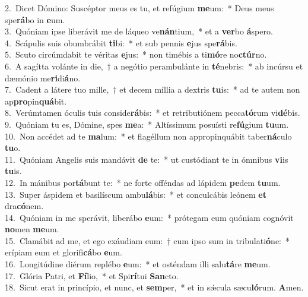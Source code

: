 {2.~}Dicet Dómino: Suscéptor meus es tu, et refúgium \textbf{me}um:~* Deus meus spe\textbf{rá}bo in \textbf{e}um.\\
{3.~}Quóniam ipse liberávit me de láqueo ve\textbf{nán}tium,~* et a \textbf{ver}bo \textbf{á}spero.\\
{4.~}Scápulis suis obumbrábit \textbf{ti}bi:~* et sub pennis \textbf{e}jus spe\textbf{rá}bis.\\
{5.~}Scuto circúmdabit te véritas \textbf{e}jus:~* non timébis a ti\textbf{mó}re no\textbf{ctúr}no.\\
{6.~}A sagítta volánte in die,~† a negótio perambulánte in \textbf{té}nebris:~* ab incúrsu et dæmónio me\textbf{ri}di\textbf{á}no.\\
{7.~}Cadent a látere tuo mille,~† et decem míllia a dextris \textbf{tu}is:~* ad te autem non ap\textbf{pro}pin\textbf{quá}bit.\\
{8.~}Verúmtamen óculis tuis conside\textbf{rá}bis:~* et retributiónem pecca\textbf{tó}rum vi\textbf{dé}bis.\\
{9.~}Quóniam tu es, Dómine, spes \textbf{me}a:~* Altíssimum posuísti re\textbf{fú}gium \textbf{tu}um.\\
{10.~}Non accédet ad te \textbf{ma}lum:~* et flagéllum non appropinquábit taber\textbf{ná}culo \textbf{tu}o.\\
{11.~}Quóniam Angelis suis mandávit \textbf{de} te:~* ut custódiant te in ómnibus \textbf{vi}is \textbf{tu}is.\\
{12.~}In mánibus por\textbf{tá}bunt te:~* ne forte offéndas ad lápidem \textbf{pe}dem \textbf{tu}um.\\
{13.~}Super áspidem et basilíscum ambu\textbf{lá}bis:~* et conculcábis leónem \textbf{et} dra\textbf{có}nem.\\
{14.~}Quóniam in me sperávit, liberábo \textbf{e}um:~* prótegam eum quóniam cognóvit \textbf{no}men \textbf{me}um.\\
{15.~}Clamábit ad me, et ego exáudiam eum:~† cum ipso sum in tribulati\textbf{ó}ne:~* erípiam eum et glorifi\textbf{cá}bo \textbf{e}um.\\
{16.~}Longitúdine diérum replébo \textbf{e}um:~* et osténdam illi salu\textbf{tá}re \textbf{me}um.\\
{17.~}Glória Patri, et \textbf{Fí}lio,~* et Spi\textbf{rí}tui \textbf{San}cto.\\
{18.~}Sicut erat in princípio, et nunc, et \textbf{sem}per,~* et in sǽcula sæcu\textbf{ló}rum. \textbf{A}men.\\
